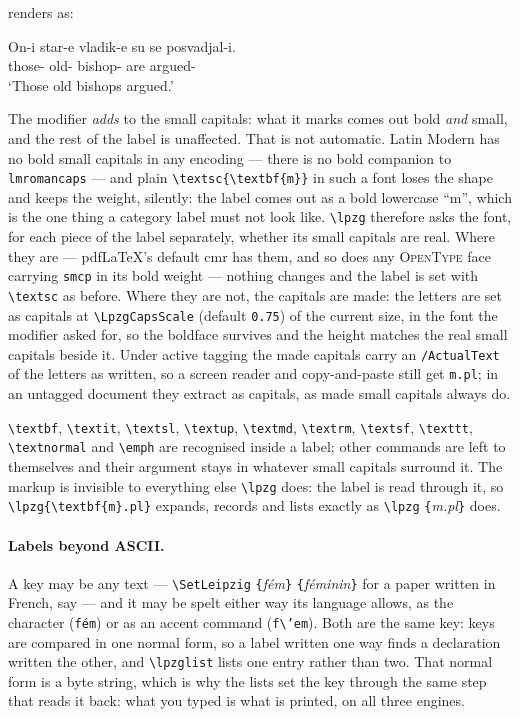 \documentclass[11pt,a4paper]{article}
\newcommand{\cs}[1]{\texttt{\textbackslash #1}}
\newcommand{\pkg}[2][]{\textsf{#2}}
\newcommand{\meta}[1]{\textrm{\itshape\textlangle#1\textrangle}}
\newcommand{\marg}[1]{\penalty300 \texttt{\{}\meta{#1}\texttt{\}}}
\newcommand{\rendered}{\par\medskip\noindent\textcolor{gray!70}{\small renders as:}\par\nobreak\smallskip}
\newcommand{\afterex}{\par\addvspace{\medskipamount}}
\begin{document}
\rendered
\gll On-i star-e vladik-e su se posvadjal-i.\\
     those- old- bishop-
       are  argued-\\
\glt `Those old bishops argued.'

\afterex
\noindent The modifier \emph{adds} to the small capitals: what it marks
comes out bold \emph{and} small, and the rest of the label is unaffected.
That is not automatic. Latin Modern has no bold small capitals in any
encoding --- there is no bold companion to \texttt{lmromancaps} --- and
plain \texttt{\textbackslash textsc\{\textbackslash textbf\{m\}\}} in such a font loses the
shape and keeps the weight, silently: the label comes out as a bold
lowercase ``m'', which is the one thing a category label must not
look like. \cs{lpzg} therefore asks the font, for each piece of the label
separately, whether its small capitals are real. Where they are ---
pdf\LaTeX's default \pkg{cmr} has them, and so does any \textsc{OpenType}
face carrying \texttt{smcp} in its bold weight --- nothing changes and the
label is set with \cs{textsc} as before. Where they are not, the capitals
are made: the letters are set as capitals at \cs{LpzgCapsScale} (default
\texttt{0.75}) of the current size, in the font the modifier asked for, so
the boldface survives and the height matches the real small capitals
beside it. Under active tagging the made capitals carry an
\texttt{/ActualText} of the letters as written, so a screen reader and
copy-and-paste still get \texttt{m.pl}; in an untagged document they
extract as capitals, as made small capitals always do.

\cs{textbf}, \cs{textit}, \cs{textsl}, \cs{textup}, \cs{textmd},
\cs{textrm}, \cs{textsf}, \cs{texttt}, \cs{textnormal} and \cs{emph} are
recognised inside a label; other commands are left to themselves and their
argument stays in whatever small capitals surround it. The markup is
invisible to everything else \cs{lpzg} does: the label is read through it,
so \texttt{\textbackslash lpzg\{\textbackslash textbf\{m\}.pl\}} expands, records and lists
exactly as \cs{lpzg}\marg{m.pl} does.

\paragraph{Labels beyond ASCII.} A key may be any text ---
\cs{SetLeipzig}\marg{fém}\marg{féminin} for a paper written in French, say
--- and it may be spelt either way its language allows, as the character
(\texttt{fém}) or as an accent command
(\texttt{f\textbackslash'em}). Both are the same key: keys are compared in
one normal form, so a label written one way finds a declaration written
the other, and \cs{lpzglist} lists one entry rather than two. That normal
form is a byte string, which is why the lists set the key through the same
step that reads it back: what you typed is what is printed, on all three
engines.
\end{document}
